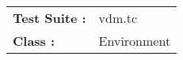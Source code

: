 






















































































































\begin{tabular}{p{25mm}l}
{\bf Test Suite :} & vdm.tc \\ 
{\bf Class :} & Environment \\ 
\end{tabular}

